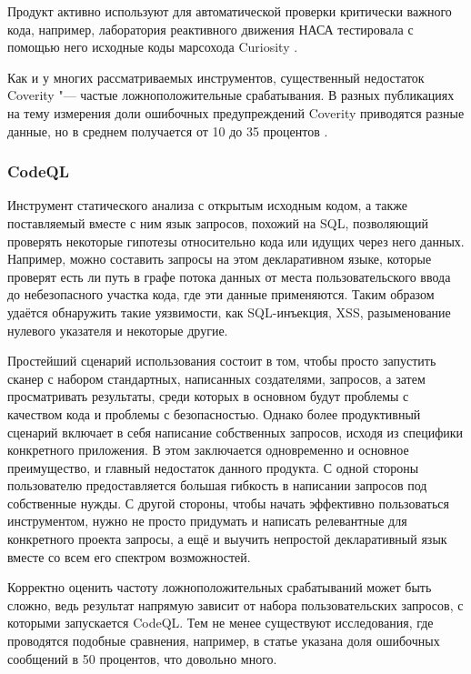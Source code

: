 Продукт активно используют для автоматической проверки критически важного кода, например, лаборатория реактивного движения НАСА тестировала с помощью него исходные коды марсохода Curiosity \cite{curiosity}.

Как и у многих рассматриваемых инструментов, существенный недостаток Coverity "--- частые ложноположительные срабатывания. 
В разных публикациях на тему измерения доли ошибочных предупреждений Coverity приводятся разные данные, но в среднем получается от 10 до 35 процентов \cite{coverity-fp-1, coverity-fp-2, coverity-fp-3}.

\subsubsection{CodeQL}

Инструмент статического анализа с открытым исходным кодом, а также поставляемый вместе с ним язык запросов, похожий на SQL, позволяющий проверять некоторые гипотезы относительно кода или идущих через него данных. Например, можно составить запросы на этом декларативном языке, которые проверят есть ли путь в графе потока данных от места пользовательского ввода до небезопасного участка кода, где эти данные применяются. Таким образом удаётся обнаружить такие уязвимости, как SQL-инъекция, XSS, разыменование нулевого указателя и некоторые другие.

Простейший сценарий использования состоит в том, чтобы просто запустить сканер с набором стандартных, написанных создателями, запросов, а затем просматривать результаты, среди которых в основном будут проблемы с качеством кода и проблемы с безопасностью. Однако более продуктивный сценарий включает в себя написание собственных запросов, исходя из специфики конкретного приложения. В этом заключается одновременно и основное преимущество, и главный недостаток данного продукта. С одной стороны пользователю предоставляется большая гибкость в написании запросов под собственные нужды. С другой стороны, чтобы начать эффективно пользоваться инструментом, нужно не просто придумать и написать релевантные для конкретного проекта запросы, а ещё и выучить непростой декларативный язык вместе со всем его спектром возможностей.

Корректно оценить частоту ложноположительных срабатываний может быть сложно, ведь результат напрямую зависит от набора пользовательских запросов, с которыми запускается CodeQL. Тем не менее существуют исследования, где проводятся подобные сравнения, например, в статье \cite{codeql-fp} указана доля ошибочных сообщений в 50 процентов, что довольно много.


